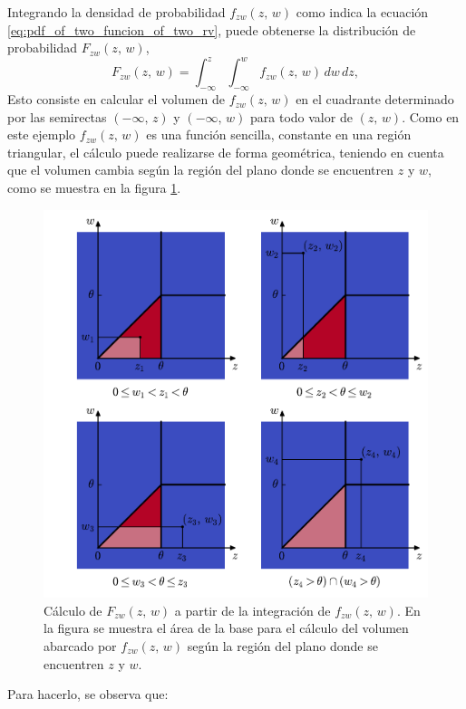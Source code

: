 \documentclass[a4paper]{report}
\begin{document}
Integrando la densidad de probabilidad \(f_{zw}(z,\,w)\) como indica la ecuación \ref{eq:pdf_of_two_funcion_of_two_rv}, puede obtenerse la distribución de probabilidad \(F_{zw}(z,\,w)\),
\[
 F_{zw}(z,\,w)=\int_{-\infty}^{z}\int_{-\infty}^{w}f_{zw}(z,\,w)\,dw\,dz,
\]
Esto consiste en calcular el volumen de \(f_{zw}(z,\,w)\) en el cuadrante determinado por las semirectas \((-\infty,\,z)\) y \((-\infty,\,w)\) para todo valor de \((z,\,w)\). Como en este ejemplo \(f_{zw}(z,\,w)\) es una función sencilla, constante en una región triangular, el cálculo puede realizarse de forma geométrica, teniendo en cuenta que el volumen cambia según la región del plano donde se encuentren \(z\) y \(w\), como se muestra en la figura \ref{fig:joint_density_function_rv_min_max_integration}.
\begin{figure}[!htb]
\begin{center}
 \includegraphics[width=0.85\columnwidth]{figuras/joint_density_function_rv_min_max_integration.pdf}
\caption{\label{fig:joint_density_function_rv_min_max_integration} Cálculo de \(F_{zw}(z,\,w)\) a partir de la integración de \(f_{zw}(z,\,w)\). En la figura se muestra el área de la base para el cálculo del volumen abarcado por \(f_{zw}(z,\,w)\) según la región del plano donde se encuentren \(z\) y \(w\).}
\end{center}
\end{figure}
Para hacerlo, se observa que:
\end{document}
